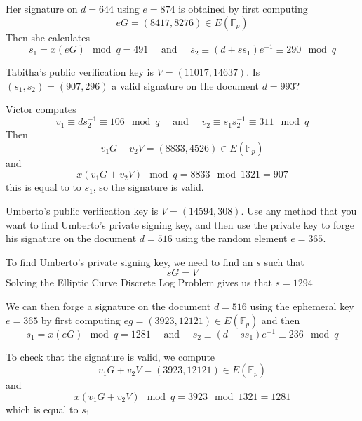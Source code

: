 \documentclass[12pt]{article}
\begin{document}
\noindent
Her signature on $d=644$ using $e=874$ is obtained by first computing
\[eG=(8417,8276)\in E(\mathbb{F}_p)\]
Then she calculates
\[s_1=x(eG)\mod{q}=491\quad\text{ and }\quad s_2\equiv(d+ss_1)e^{-1}\equiv290\mod{q}\]

\subproblem Tabitha's public verification key is $V=(11017,14637)$. Is $(s_1,s_2)=(907,296)$ a valid signature on the document $d=993$?

\solution
Victor computes
\[v_1\equiv ds_2^{-1}\equiv 106\mod{q}\quad\text{ and }\quad v_2\equiv s_1s_2^{-1}\equiv 311\mod{q}\]
Then
\[v_1G+v_2V=(8833,4526)\in E(\mathbb{F}_p)\]
and
\[x(v_1G+v_2V)\mod{q}=8833\mod{1321}=907\]
this is equal to to $s_1$, so the signature is valid.

\newpage
\subproblem Umberto's public verification key is $V=(14594,308)$. Use any method that you want to find Umberto's private signing key, and then use the private key to forge his signature on the document $d=516$ using the random element $e=365$.

\solution
To find Umberto's private signing key, we need to find an $s$ such that
\[sG=V\]
Solving the Elliptic Curve Discrete Log Problem gives us that $s=1294$

\noindent
We can then forge a signature on the document $d=516$ using the ephemeral key $e=365$ by first computing $eg=(3923,12121)\in E(\mathbb{F}_p)$ and then
\[s_1=x(eG)\mod{q}=1281\quad\text{ and }\quad s_2\equiv(d+ss_1)e^{-1}\equiv236\mod{q}\]

\noindent
To check that the signature is valid, we compute
\[v_1G+v_2V=(3923,12121)\in E(\mathbb{F}_p)\]
and
\[x(v_1G+v_2V)\mod{q}=3923\mod{1321}=1281\]
which is equal to $s_1$

\newpage
\inputminted{python}{ecc_finite.py}
\end{document}
